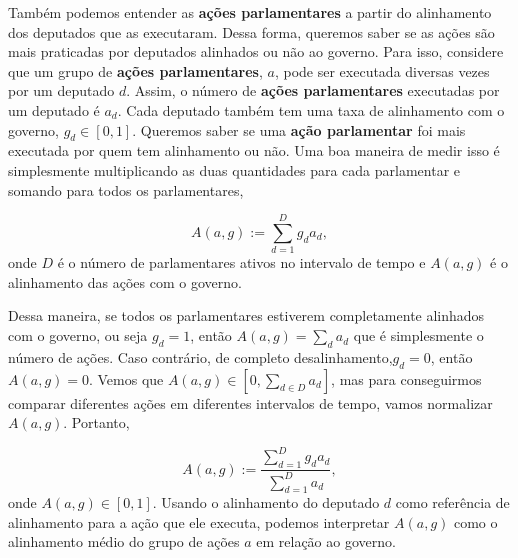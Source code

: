 \documentclass[12pt,a4paper]{article}
\begin{document}
Também podemos entender as \textbf{ações parlamentares} a partir do alinhamento dos deputados que as executaram. Dessa forma, queremos saber se as ações são mais praticadas por deputados alinhados ou não ao governo. Para isso, considere que um grupo de \textbf{ações parlamentares}, $a$, pode ser executada diversas vezes por um deputado $d$. Assim, o número de \textbf{ações parlamentares} executadas por um deputado é $a_d$.  Cada deputado também tem uma taxa de alinhamento com o governo, $g_d \in [0, 1]$. Queremos saber se uma \textbf{ação parlamentar} foi mais executada por quem tem alinhamento ou não. Uma boa maneira de medir isso é simplesmente multiplicando as duas quantidades para cada parlamentar e somando para todos os parlamentares,

\[A(a, g) := \sum_{d=1}^D g_d a_d, \]
onde $D$ é o número de parlamentares ativos no intervalo de tempo e $A(a,g)$ é o alinhamento das ações com o governo. 

Dessa maneira, se todos os parlamentares estiverem completamente alinhados com o governo, ou seja $g_d = 1$, então $A(a,g) = \sum_{d} a_d$ que é simplesmente o número de ações. Caso contrário, de completo desalinhamento,$g_d = 0$, então  $A(a,g) =0$.  Vemos que $A(a,g) \in [0, \sum_{d\in D} a_d]$, mas para conseguirmos comparar diferentes ações em diferentes intervalos de tempo, vamos normalizar $A(a,g)$. Portanto,

\[A(a, g) := \frac{\sum_{d=1}^D g_d a_d}{\sum_{d=1}^D a_d}, \]
onde $A(a,g) \in [0,1]$. Usando o alinhamento do deputado $d$ como referência de alinhamento para a ação que ele executa, podemos interpretar  $A(a,g)$ como o alinhamento médio do grupo de ações $a$ em relação ao governo.

\end{document}
